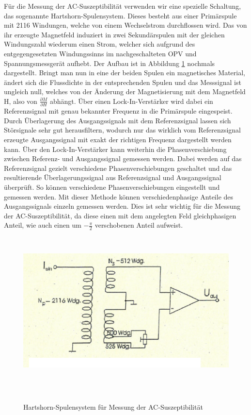 Für die Messung der AC-Suszeptibilität verwenden wir eine spezielle Schaltung, das sogenannte Hartshorn-Spulensystem. Dieses besteht aus einer Primärspule mit 2116 Windungen, welche von einem Wechselstrom durchflossen wird. Das von ihr erzeugte Magnetfeld induziert in zwei Sekundärspulen mit der gleichen Windungszahl wiederum einen Strom, welcher sich aufgrund des entgegengesetzten Windungssinns im nachgeschalteten OPV und Spannungsmessgerät aufhebt. Der Aufbau ist in Abbildung \ref{aufbau-AC} nochmals dargestellt. Bringt man nun in eine der beiden Spulen ein magnetisches Material, ändert sich die Flussdichte in der entsprechenden Spulen und das Messsignal ist ungleich null, welches von der Änderung der Magnetisierung mit dem Magnetfeld H, also von $\frac{\partial M}{\partial H}$ abhängt. Über einen Lock-In-Verstärker wird dabei ein Referenzsignal mit genau bekannter Frequenz in die Primärspule eingespeist. Durch Überlagerung des Ausgangssignals mit dem Referenzsignal lassen sich Störsignale sehr gut herausfiltern, wodurch nur das wirklich vom Referenzsignal erzeugte Ausgangssignal mit exakt der richtigen Frequenz dargestellt werden kann. Über den Lock-In-Verstärker kann weiterhin die Phasenverschiebung zwischen Referenz- und Ausgangssignal gemessen werden. Dabei werden auf das Referenzsignal gezielt verschiedene Phasenverschiebungen geschaltet und das resultierende Überlagerungssignal aus Referenzsignal und Ausgangssignal überprüft. So können verschiedene Phasenverschiebungen eingestellt und gemessen werden. Mit dieser Methode können verschiedenphasige Anteile des Ausgangssignals einzeln gemessen werden. Dies ist sehr wichtig für die Messung der AC-Suszeptibilität, da diese einen mit dem angelegten Feld gleichphasigen Anteil, wie auch einen um $-\frac{\pi}{2}$ verschobenen Anteil aufweist. 


\begin{figure}[h!]
	\centering
	\includegraphics[height=8cm]{AC-auf.png}	
	~ %
	\caption{Hartshorn-Spulensystem für Messung der AC-Suszeptibilität \cite{Anleitung}}
	\label{aufbau-AC}
\end{figure}

